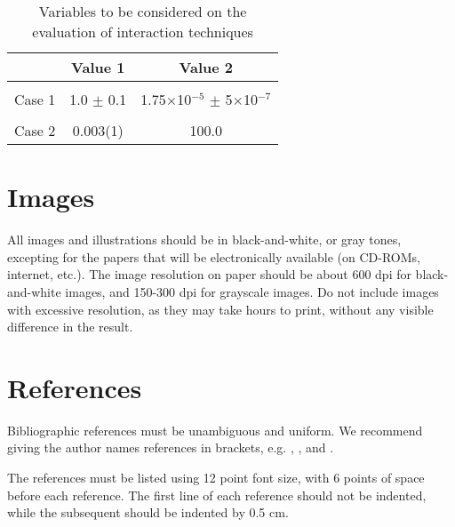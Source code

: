 \documentclass[12pt]{article}
\begin{document}
\begin{table}[ht]
\centering
\caption{Variables to be considered on the evaluation of interaction
  techniques}
\label{tab:exTable1}
\smallskip
\begin{tabular}{|l|c|c|}
\hline
& Value 1 & Value 2\\[0.5ex]
\hline
&&\\[-2ex]
Case 1 & 1.0 $\pm$ 0.1 & 1.75$\times$10$^{-5}$ $\pm$ 5$\times$10$^{-7}$\\[0.5ex]
\hline
&&\\[-2ex]
Case 2 & 0.003(1) & 100.0\\[0.5ex]
\hline
\end{tabular}
\end{table}

\section{Images}

All images and illustrations should be in black-and-white, or gray tones,
excepting for the papers that will be electronically available (on CD-ROMs,
internet, etc.). The image resolution on paper should be about 600 dpi for
black-and-white images, and 150-300 dpi for grayscale images.  Do not include
images with excessive resolution, as they may take hours to print, without any
visible difference in the result.

\section{References}

Bibliographic references must be unambiguous and uniform.  We recommend giving
the author names references in brackets, e.g. \cite{knuth:84},
\cite{boulic:91}, and \cite{smith:99}.

The references must be listed using 12 point font size, with 6 points of space
before each reference. The first line of each reference should not be
indented, while the subsequent should be indented by 0.5 cm.





\end{document}
